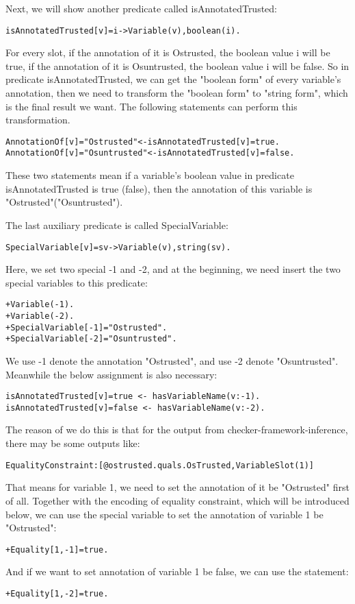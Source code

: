 \documentclass{article}
\begin{document}
Next, we will show another predicate called isAnnotatedTrusted:
\begin{lstlisting}
isAnnotatedTrusted[v]=i->Variable(v),boolean(i).
\end{lstlisting}
For every slot, if the annotation of it is Ostrusted, the boolean value i will be true, if the annotation of it is Osuntrusted, the boolean value i will be false.
So in predicate isAnnotatedTrusted, we can get the "boolean form" of every variable's annotation, then we need to transform the "boolean form" to "string form", which is the final result we want. The following statements can perform this transformation. 
\begin{lstlisting}
AnnotationOf[v]="Ostrusted"<-isAnnotatedTrusted[v]=true.
AnnotationOf[v]="Osuntrusted"<-isAnnotatedTrusted[v]=false.
\end{lstlisting}
These two statements mean if a variable's boolean value in predicate isAnnotatedTrusted is true (false), then the annotation of this variable is "Ostrusted"("Osuntrusted").

The last auxiliary predicate is called SpecialVariable:
\begin{lstlisting}
SpecialVariable[v]=sv->Variable(v),string(sv).
\end{lstlisting}
Here, we set two special -1 and -2, and at the beginning, we need insert the two special variables to this predicate: 
\begin{lstlisting}
+Variable(-1).
+Variable(-2).
+SpecialVariable[-1]="Ostrusted".
+SpecialVariable[-2]="Osuntrusted".
\end{lstlisting}
We use -1 denote the annotation "Ostrusted", and use -2 denote "Osuntrusted".
Meanwhile the below assignment is also necessary:
\begin{lstlisting}
isAnnotatedTrusted[v]=true <- hasVariableName(v:-1).
isAnnotatedTrusted[v]=false <- hasVariableName(v:-2).
\end{lstlisting}
The reason of we do this is that for the output from checker-framework-inference, there may be some outputs like:
\begin{lstlisting}[breaklines=true]
EqualityConstraint:[@ostrusted.quals.OsTrusted,VariableSlot(1)]
\end{lstlisting}
That means for variable 1, we need to set the annotation of it be "Ostrusted" first of all.  Together with the encoding of equality constraint, which will be introduced below, we can use the special variable to set the annotation of variable 1 be "Ostrusted":
\begin{lstlisting}
+Equality[1,-1]=true.
\end{lstlisting}
And if we want to set annotation of variable 1 be false, we can use the statement:
\begin{lstlisting}
+Equality[1,-2]=true.
\end{lstlisting}
\end{document}
